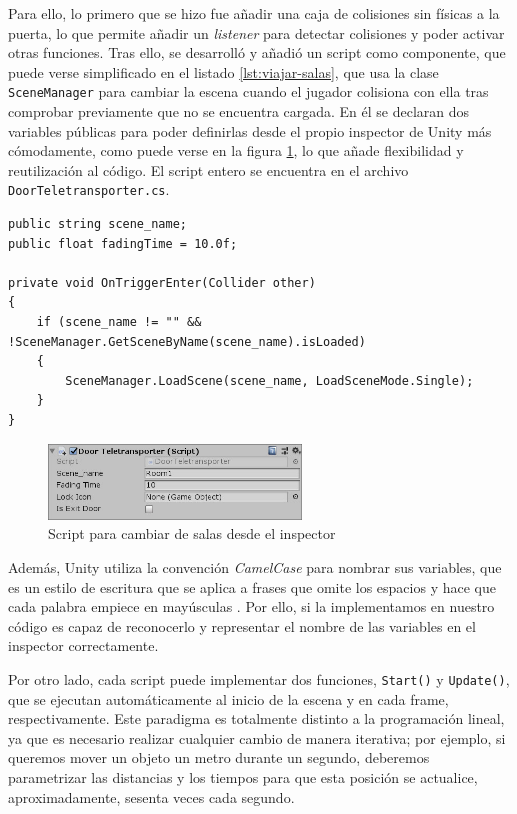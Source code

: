 Para ello, lo primero que se hizo fue añadir una caja de colisiones sin físicas a la puerta, lo que permite añadir un \textit{listener} para detectar colisiones y poder activar otras funciones. Tras ello, se desarrolló y añadió un script como componente, que puede verse simplificado en el listado \ref{lst:viajar-salas}, que usa la clase \texttt{SceneManager} para cambiar la escena cuando el jugador colisiona con ella tras comprobar previamente que no se encuentra cargada. En él se declaran dos variables públicas para poder definirlas desde el propio inspector de Unity más cómodamente, como puede verse en la figura \ref{fig:door-teleporter-inspector}, lo que añade flexibilidad y reutilización al código. El script entero se encuentra en el archivo \texttt{DoorTeletransporter.cs}.

\begin{lstlisting}[caption=Fragmento del script para viajar entre salas, label=lst:viajar-salas]
public string scene_name;
public float fadingTime = 10.0f;

private void OnTriggerEnter(Collider other)
{
    if (scene_name != "" && !SceneManager.GetSceneByName(scene_name).isLoaded)
    {
        SceneManager.LoadScene(scene_name, LoadSceneMode.Single);
    }
}
\end{lstlisting}

\begin{figure}[!h]
\begin{center}
\includegraphics[width=0.6\textwidth]{imagenes/7/door-teleporter-inspector.jpg}
\caption{Script para cambiar de salas desde el inspector}
\label{fig:door-teleporter-inspector}
\end{center}
\end{figure}

Además, Unity utiliza la convención \textit{CamelCase} para nombrar sus variables, que es un estilo de escritura que se aplica a frases que omite los espacios y hace que cada palabra empiece en mayúsculas . Por ello, si la implementamos en nuestro código es capaz de reconocerlo y representar el nombre de las variables en el inspector correctamente.

Por otro lado, cada script puede implementar dos funciones, \texttt{Start()} y \texttt{Update()}, que se ejecutan automáticamente al inicio de la escena y en cada frame, respectivamente. Este paradigma es totalmente distinto a la programación lineal, ya que es necesario realizar cualquier cambio de manera iterativa; por ejemplo, si queremos mover un objeto un metro durante un segundo, deberemos parametrizar las distancias y los tiempos para que esta posición se actualice, aproximadamente, sesenta veces cada segundo.


